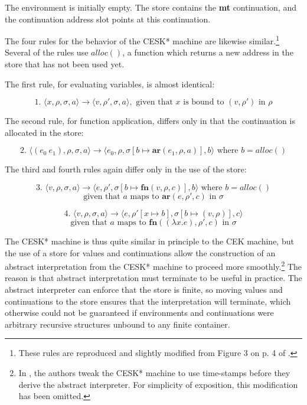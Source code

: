 \documentclass{article}
\begin{document}
The environment is initially empty. The store contains the \textbf{mt} continuation, and the continuation address slot points at this continuation.

The four rules for the behavior of the CESK* machine are likewise similar.\footnote{These rules are reproduced and slightly modified from Figure 3 on p. 4 of \cite{aam}.} Several of the rules use $alloc()$, a function which returns a new address in the store that has not been used yet.

The first rule, for evaluating variables, is almost identical:

$$
\text{1. }
\langle x, \rho, \sigma, a \rangle
\to
\langle v, \rho', \sigma, a \rangle,
\text{ given that $x$ is bound to $(v, \rho')$ in $\rho$}
$$

The second rule, for function application, differs only in that the continuation is allocated in the store:

$$
\text{2. }
\langle (e_0\ e_1), \rho, \sigma, a \rangle
\to
\langle e_0, \rho, \sigma[b \mapsto \textbf{ar}(e_1, \rho, a)], b \rangle
\text{ where $b = alloc()$}
$$

The third and fourth rules again differ only in the use of the store:

$$
\text{3. }
\langle v, \rho, \sigma, a \rangle
\to
\langle e, \rho', \sigma[b \mapsto \textbf{fn}(v, \rho, c)], b \rangle
\text{ where $b = alloc()$}
$$
$$
\text{given that $a$ maps to $\textbf{ar}(e, \rho', c)$ in $\sigma$}
$$

$$
\text{4. }
\langle v, \rho, \sigma, a \rangle
\to
\langle e, \rho'[x \mapsto b], \sigma[b \mapsto (v, \rho)], c \rangle
$$
$$
\text{given that $a$ maps to $\textbf{fn}((\lambda x.e), \rho', c)$ in $\sigma$}
$$

The CESK* machine is thus quite similar in principle to the CEK machine, but the use of a store for values and continuations allow the construction of an abstract interpretation from the CESK* machine to proceed more smoothly.\footnote{In \cite{aam}, the authors tweak the CESK* machine to use time-stamps before they derive the abstract interpreter. For simplicity of exposition, this modification has been omitted.} The reason is that abstract interpretation must terminate to be useful in practice. The abstract interpreter can enforce that the store is finite, so moving values and continuations to the store ensures that the interpretation will terminate, which otherwise could not be guaranteed if environments and continuations were arbitrary recursive structures unbound to any finite container.
\end{document}
